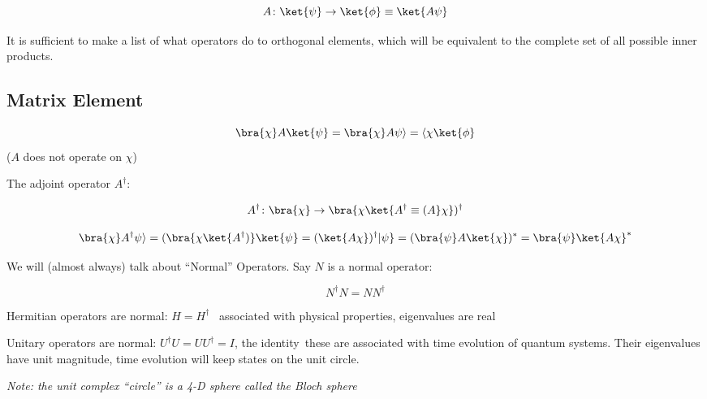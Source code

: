 \documentclass[a4paper,twoside,master.tex]{subfiles}
\begin{document}
\begin{equation}
A\colon\ket{\psi}\to\ket{\phi}\equiv\ket{A\psi}
\end{equation}

It is sufficient to make a list of what operators do to orthogonal
elements, which will be equivalent to the complete set of all possible
inner products.

\subsection{Matrix Element}
\label{sub:matrix_element}

\begin{equation}
\bra{ \chi}A\ket{\psi} = \bra{\chi}A\psi\rangle = \langle\chi\ket{\phi}
\end{equation}
($A$ does not operate on $\chi$)

The adjoint operator $A^\dagger$:

\begin{equation}
    A^\dagger\colon\bra{\chi}\to\bra{\chi\ket{A^\dagger\equiv(A}\chi})^\dagger
\end{equation}

\begin{equation}
\bra{\chi}A^\dagger\psi\rangle = (\bra{\chi\ket{A^\dagger)}\ket{\psi} = (\ket{A\chi})^\dagger|\psi} = (\bra{\psi}A\ket{\chi})^* = \bra{\psi}\ket{A\chi}^*
\end{equation}

We will (almost always) talk about ``Normal'' Operators. Say $N$ is a
normal operator:

\begin{equation}
N^\dagger N = NN^\dagger
\end{equation}

Hermitian operators are normal: $H = H^\dagger$ \textemdash\ associated with
physical properties, eigenvalues are real

Unitary operators are normal: $U^\dagger U = UU^\dagger = I$, the
identity\textemdash\ these are associated with time evolution of quantum systems.
Their eigenvalues have unit magnitude, time evolution will keep states
on the unit circle.

\emph{Note: the unit complex ``circle'' is a 4-D sphere called the Bloch
sphere}
\end{document}

